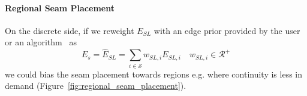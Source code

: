 \paragraph{Regional Seam Placement} \minchen{[TODO]} On the discrete side, if we reweight $E_{SL}$ with an edge prior provided by the user or an algorithm~\cite{} as
\[ E_s = \hat{E}_{SL} = \sum_{i\in\mathcal{S}} w_{SL,i} E_{SL,i} \quad w_{SL,i} \in \mathcal{R^+} \]
we could bias the seam placement towards regions e.g. where continuity is less in demand (Figure~\ref{fig:regional_seam_placement}).


